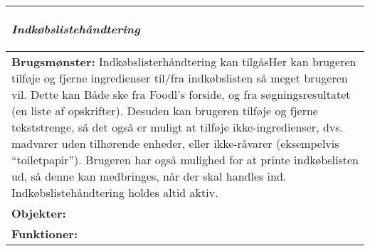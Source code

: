 \begin{tabular}{p{\textwidth}}
    \hline
    \begin{center} 
    \textbf{\textit{Indkøbslistehåndtering}} 
    \end{center} \\ \hline
    \textbf{Brugsmønster:} Indkøbslisterhåndtering kan tilgåsHer kan brugeren tilføje og fjerne ingredienser til/fra indkøbslisten så meget brugeren vil. Dette kan Både ske fra Foodl’s forside, og fra søgningsresultatet (en liste af opskrifter). Desuden kan brugeren tilføje og fjerne tekststrenge, så det også er muligt at tilføje ikke-ingredienser, dvs. madvarer uden tilhørende enheder, eller ikke-råvarer (eksempelvis “toiletpapir”). Brugeren har også mulighed for at printe indkøbslisten ud, så denne kan medbringes, når der skal handles ind. Indkøbslistehåndtering holdes altid aktiv. \\
    \textbf{Objekter:}  \\
    \textbf{Funktioner:}  \\ \hline
\end{tabular}